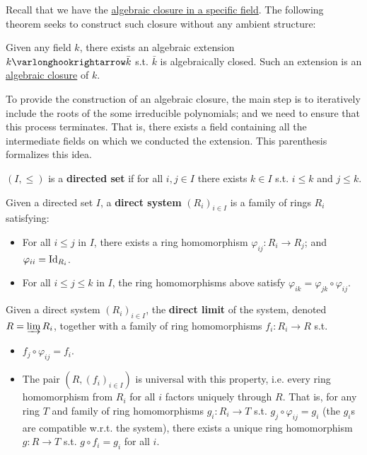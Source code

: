 Recall that we have the \hyperref[def: algebraic closure with ambient field]{algebraic closure in a specific field}. The following theorem seeks to construct such closure without any ambient structure:

\begin{theorem}\label{thm: algebraic closure exists}
    Given any field $k$, there exists an algebraic extension $k \ext \bar{k}$ s.t. $\bar{k}$ is algebraically closed. Such an extension is an \underline{algebraic closure} of $k$.
\end{theorem}

\begin{parenthesis}\label{pth: direct limit}
    To provide the construction of an algebraic closure, the main step is to iteratively include the roots of the some irreducible polynomials; and we need to ensure that this process terminates. That is, there exists a field containing all the intermediate fields on which we conducted the extension. This parenthesis formalizes this idea.

    \begin{definition}
        $(I, \leq)$ is a \textbf{directed set} if for all $i, j \in I$ there exists $k \in I$ s.t. $i \leq k$ and $j \leq k$.
    \end{definition}

    \begin{definition}
        Given a directed set $I$, a \textbf{direct system} $(R_i)_{i \in I}$ is a family of rings $R_i$ satisfying:
        \begin{itemize}
            \item For all $i \leq j$ in $I$, there exists a ring homomorphism $\varphi_{ij}: R_i \to R_j$; and $\varphi_{ii} = \mathrm{Id}_{R_i}$.
            \item For all $i \leq j \leq k$ in $I$, the ring homomorphisms above satisfy $\varphi_{ik} = \varphi_{jk} \circ \varphi_{ij}$.
        \end{itemize}
    \end{definition}

    \begin{definition}
        Given a direct system $(R_i)_{i \in I}$, the \textbf{direct limit} of the system, denoted $R = \varinjlim R_i$, together with a family of ring homomorphisms $f_i: R_i \to R$ s.t.
        \begin{itemize}
            \item $f_j \circ \varphi_{ij} = f_i$.
            \item The pair $(R, (f_i)_{i \in I})$ is universal with this property, i.e. every ring homomorphism from $R_i$ for all $i$ factors uniquely through $R$. That is, for any ring $T$ and family of ring homomorphisms $g_i: R_i \to T$ s.t. $g_j \circ \varphi_{ij} = g_i$ (the $g_i$s are compatible w.r.t. the system), there exists a unique ring homomorphism $g: R \to T$ s.t. $g \circ f_i = g_i$ for all $i$.
        \end{itemize}
    \end{definition}


\end{parenthesis}
